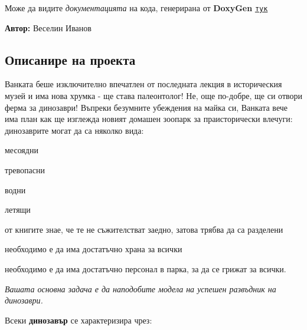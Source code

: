 Може да видите {\itshape документацията} на кода, генерирана от {\bfseries Doxy\+Gen} \href{https://ivanov1234159.github.io/JurassicPark/html/index.html}{\tt тук}

{\bfseries Автор\+:} Веселин Иванов

\subsection*{Описанире на проекта}

Ванката беше изключително впечатлен от последната лекция в историческия музей и има нова хрумка -\/ ще става палеонтолог! Не, още по-\/добре, ще си отвори ферма за динозаври! Въпреки безумните убеждения на майка си, Ванката вече има план как ще изглежда новият домашен зоопарк за праисторически влечуги\+: динозаврите могат да са няколко вида\+:


\begin{DoxyItemize}
\item месоядни
\item тревопасни
\item водни
\item летящи
\end{DoxyItemize}

от книгите знае, че те не съжителстват заедно, затова трябва да са разделени

необходимо е да има достатъчно храна за всички

необходимо е да има достатъчно персонал в парка, за да се грижат за всички.

{\itshape Вашата основна задача е да наподобите модела на успешен развъдник на динозаври.}

Всеки {\bfseries динозавър} се характеризира чрез\+:


